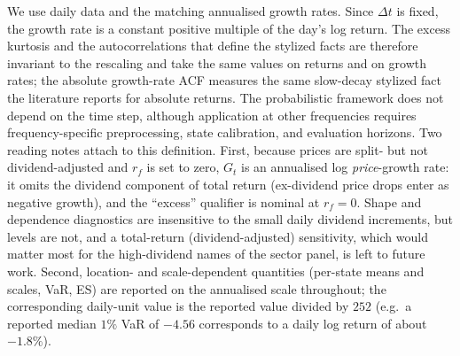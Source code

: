 We use daily data and the matching annualised growth rates. Since $\Delta t$ is fixed, the growth rate is a constant positive multiple of the day's log return. The excess kurtosis and the autocorrelations that define the stylized facts are therefore invariant to the rescaling and take the same values on returns and on growth rates; the absolute growth-rate ACF measures the same slow-decay stylized fact the literature reports for absolute returns. The probabilistic framework does not depend on the time step, although application at other frequencies requires frequency-specific preprocessing, state calibration, and evaluation horizons. Two reading notes attach to this definition. First, because prices are split- but not dividend-adjusted and $r_f$ is set to zero, $G_t$ is an annualised log \emph{price}-growth rate: it omits the dividend component of total return (ex-dividend price drops enter as negative growth), and the ``excess'' qualifier is nominal at $r_f = 0$. Shape and dependence diagnostics are insensitive to the small daily dividend increments, but levels are not, and a total-return (dividend-adjusted) sensitivity, which would matter most for the high-dividend names of the sector panel, is left to future work. Second, location- and scale-dependent quantities (per-state means and scales, VaR, ES) are reported on the annualised scale throughout; the corresponding daily-unit value is the reported value divided by $252$ (e.g.\ a reported median $1\%$ VaR of $-4.56$ corresponds to a daily log return of about $-1.8\%$).

